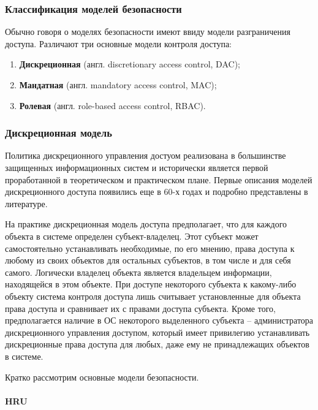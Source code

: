 \subsubsection{Классификация моделей безопасности}

Обычно говоря о моделях безопасности имеют ввиду модели разграничения доступа. Различают три основные модели контроля доступа:

\begin{enumerate}
    \item\textbf{Дискреционная} (англ. discretionary access control, DAC);
    \item\textbf{Мандатная} (англ. mandatory access control, MAC);
    \item\textbf{Ролевая} (англ. role-based access control, RBAC).
\end{enumerate}

\subsubsection{Дискреционная модель}

Политика дискреционного управления достуом реализована в большинстве защищенных информационных систем и исторически является первой проработанной в теоретическом и практическом плане. Первые описания моделей дискреционного доступа появились еще в 60-х годах и подробно представлены в литературе. 
					
На практике дискреционная модель доступа предполагает, что для каждого объекта в системе определен субъект-владелец. Этот субъект может самостоятельно устанавливать необходимые, по его мнению, права доступа к любому из своих объектов для остальных субъектов, в том числе и для себя самого. Логически владелец объекта является владельцем информации, находящейся в этом объекте.  При доступе некоторого субъекта к какому-либо объекту система контроля доступа лишь считывает установленные для объекта права доступа и сравнивает их с правами доступа субъекта. Кроме того, предполагается наличие в ОС некоторого выделенного субъекта -- администратора дискреционного управления доступом, который имеет привилегию устанавливать дискреционные права доступа для любых, даже ему не принадлежащих объектов в системе.

Кратко рассмотрим основные модели безопасности.

\paragraph{HRU}

